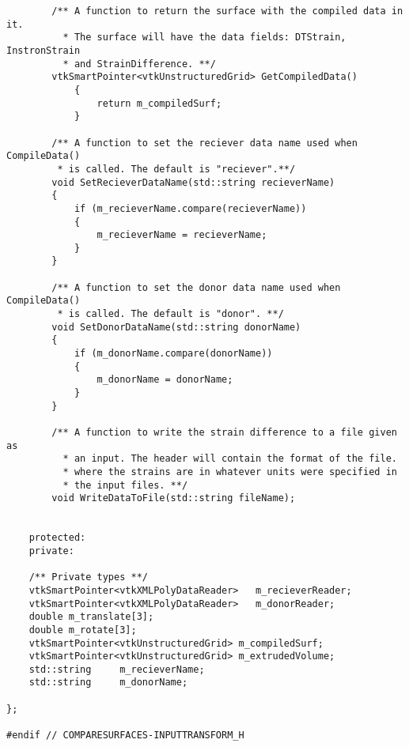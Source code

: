\begin{lstlisting}
        /** A function to return the surface with the compiled data in it.
          * The surface will have the data fields: DTStrain, InstronStrain
          * and StrainDifference. **/
        vtkSmartPointer<vtkUnstructuredGrid> GetCompiledData()
            {
                return m_compiledSurf;
            }

        /** A function to set the reciever data name used when CompileData()
         * is called. The default is "reciever".**/
        void SetRecieverDataName(std::string recieverName)
        {
            if (m_recieverName.compare(recieverName))
            {
                m_recieverName = recieverName;
            }
        }

        /** A function to set the donor data name used when CompileData()
         * is called. The default is "donor". **/
        void SetDonorDataName(std::string donorName)
        {
            if (m_donorName.compare(donorName))
            {
                m_donorName = donorName;
            }
        }

        /** A function to write the strain difference to a file given as
          * an input. The header will contain the format of the file.
          * where the strains are in whatever units were specified in
          * the input files. **/
        void WriteDataToFile(std::string fileName);


    protected:
    private:

    /** Private types **/
    vtkSmartPointer<vtkXMLPolyDataReader>   m_recieverReader;
    vtkSmartPointer<vtkXMLPolyDataReader>   m_donorReader;
    double m_translate[3];
    double m_rotate[3];
    vtkSmartPointer<vtkUnstructuredGrid> m_compiledSurf;
    vtkSmartPointer<vtkUnstructuredGrid> m_extrudedVolume;
    std::string     m_recieverName;
    std::string     m_donorName;

};

#endif // COMPARESURFACES-INPUTTRANSFORM_H

\end{lstlisting}

